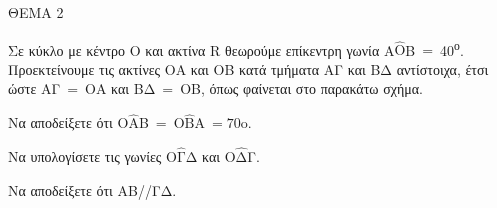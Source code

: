 
ΘΕΜΑ 2

Σε κύκλο με κέντρο Ο και ακτίνα R θεωρούμε επίκεντρη γωνία Α$\widehat{\text{Ο}}$Β$\  = \ $40\textsuperscript{ο}. Προεκτείνουμε τις ακτίνες ΟΑ και ΟΒ κατά τμήματα ΑΓ και ΒΔ αντίστοιχα, έτσι ώστε ΑΓ$\  = \ $ΟΑ και ΒΔ$\  = \ $ΟΒ, όπως φαίνεται στο παρακάτω σχήμα.

\begin{alist}
\item Να αποδείξετε ότι Ο$\widehat{\text{Α}}$Β$\  = \ $Ο$\widehat{\text{Β}}$Α$\  = 7\text{0}\text{ο}$.


\item Να υπολογίσετε τις γωνίες $\text{O}\widehat{\text{Γ}}$Δ και $\text{O}\widehat{\text{Δ}}$Γ.


\item Να αποδείξετε ότι ΑΒ//ΓΔ.



\end{alist}
